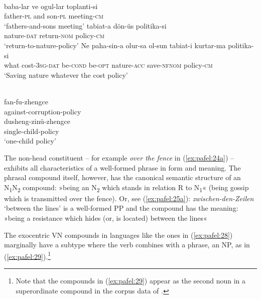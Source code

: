 \documentclass[output=paper]{LSP/langsci}
\begin{document}
\ea
      \\
      \ea\label{ex:pafel:26a}      
      \gll  baba-lar ve ogul-lar toplanti-si  \\
            father-\textsc{pl} and son-\textsc{pl} meeting-\textsc{cm}    \\
      \glt  `fathers-and-sons meeting'
      \ex\label{ex:pafel:26b}
      \gll   tabiat-a dön-üs politika-si \\
             nature-\textsc{dat} return-\textsc{nom} policy-\textsc{cm}  \\
      \glt  `return-to-nature-policy'
      \ex\label{ex:pafel:26c}
      \gll   {\ob}Ne paha-sin-a olur-sa ol-sun tabiat-i kurtar-ma{\cb} politika-si \\
             what cost-3\textsc{sg}-\textsc{dat} be-\textsc{cond} be-\textsc{opt} nature-\textsc{acc} save-\textsc{nfnom} policy-\textsc{cm}  \\
      \glt  `Saving nature whatever the cost policy'
    \z
\z        
      
\ea
      \\
      \ea\label{ex:pafel:27a}      
      \gll  fan-fu-zhengce  \\
            against-corruption-policy  \\
      \ex\label{ex:pafel:27b}
      \gll   dusheng-zinü-zhengce   \\
             single-child-policy   \\
      \glt  `one-child policy'
    \z
\z 
         

The non-head constituent – for example \textit{over the fence} in (\ref{ex:pafel:24a}) – exhibits all characteristics of a well-formed phrase in form and meaning. The phrasal compound itself, however, has the canonical semantic structure of an N\textsubscript{1}N\textsubscript{2} compound: »being an N\textsubscript{2} which stands in relation R to N\textsubscript{1}« (being gossip which is transmitted over the fence). Or, see (\ref{ex:pafel:25a}): \textit{zwischen-den-Zeilen} `between the lines' is a well-formed PP and the compound has the meaning: »being a resistance which hides (or, is located) between the lines«
 
The exocentric VN compounds in  languages like the ones in (\ref{ex:pafel:28}) marginally have a subtype where the verb combines with a phrase, an NP, as in (\ref{ex:pafel:29}).\footnote{Note that the compounds in (\ref{ex:pafel:29}) appear as the second noun in a superordinate compound in the corpus data of \citet{Bisetto2015}.}
\end{document}

